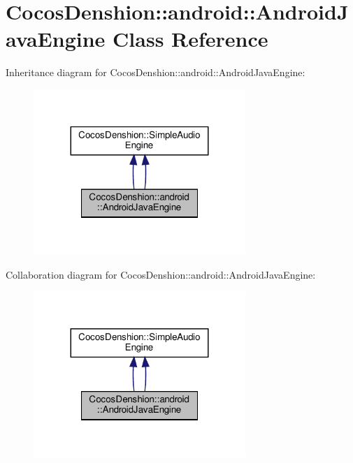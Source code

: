 \hypertarget{classCocosDenshion_1_1android_1_1AndroidJavaEngine}{}\section{Cocos\+Denshion\+:\+:android\+:\+:Android\+Java\+Engine Class Reference}
\label{classCocosDenshion_1_1android_1_1AndroidJavaEngine}


Inheritance diagram for Cocos\+Denshion\+:\+:android\+:\+:Android\+Java\+Engine\+:
\nopagebreak
\begin{figure}[H]
\begin{center}
\leavevmode
\includegraphics[width=227pt]{classCocosDenshion_1_1android_1_1AndroidJavaEngine__inherit__graph}
\end{center}
\end{figure}


Collaboration diagram for Cocos\+Denshion\+:\+:android\+:\+:Android\+Java\+Engine\+:
\nopagebreak
\begin{figure}[H]
\begin{center}
\leavevmode
\includegraphics[width=227pt]{classCocosDenshion_1_1android_1_1AndroidJavaEngine__coll__graph}
\end{center}
\end{figure}
